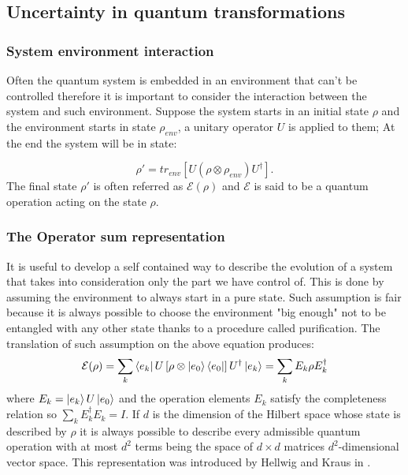 \documentclass{article}
\begin{document}
\subsection{Uncertainty in quantum transformations}

\subsubsection{System environment interaction}

Often the quantum system is embedded in an environment that can't be
controlled therefore it is important to consider the interaction
between the system and such environment.
Suppose the system starts in an initial state $\rho$ and the environment
starts in state $\rho_{env}$, a unitary operator $U$ is applied to them;
At the end the system will be in state:

\begin{equation}
	\rho' = tr_{env} \left[U (\rho \otimes \rho_{env})U^\dag \right].
\end{equation}
The final state $\rho'$ is often referred as $\mathcal {E}(\rho)$ and
$\mathcal {E}$ is said to be a quantum operation acting on the state $\rho$.

\subsubsection{The Operator sum representation}

It is useful to develop a self contained way to describe the evolution
of a system that takes into consideration only the part we have control of.
This is done by assuming the environment to always start in a pure state.
Such assumption is fair because it is always possible to choose the environment
"big enough" not to be entangled with any other state thanks to a procedure
called purification.
The translation of such assumption on the above equation produces:
\begin{equation}
	\mathcal{E}(\rho) =  \sum_{k} \bra{e_k}U \left[ \rho \otimes \ket{e_0}\bra{e_0}
		\right] U^\dagger \ket{e_k} = \sum_k E_k \rho E_k^\dagger  \\
\end{equation}
where $E_k=\ket{e_k}U\ket{e_0}$ and the operation elements $E_k$ satisfy
the completeness relation so $\sum_k E_k^\dagger E_k = I$.
If $d$ is the dimension of the Hilbert space whose state is described by
$\rho$ it is always possible to describe every admissible quantum operation
with at most $d^2$ terms being the space of $d \times d $ matrices $d^2$-dimensional
vector space.
This representation was introduced by Hellwig and Kraus in \cite{hellwig1969pure}.
\end{document}
